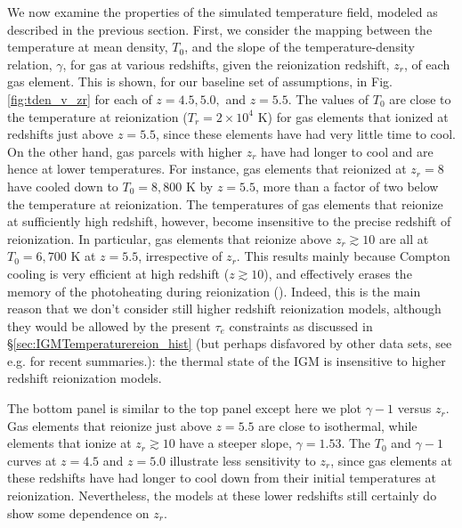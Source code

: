 We now examine the properties of the simulated temperature field, modeled as described in the previous section. 
First, we consider the mapping between the temperature at mean density, $T_0$, and the slope of the temperature-density
relation, $\gamma$, for gas at various redshifts, given the reionization redshift, $z_r$, of each gas element. This
is shown, for our baseline set of assumptions, in Fig. \ref{fig:tden_v_zr} for each of $z=4.5,5.0,$ and $z=5.5$.
The values of $T_0$ are close to the temperature at reionization ($T_r = 2 \times 10^4$ K) for gas elements that ionized at redshifts
just above $z=5.5$, since these elements have had very little time to cool. On the other hand, gas parcels with higher $z_r$ have had longer to cool
and are hence at lower temperatures. For instance, gas elements that reionized at $z_r = 8$ have cooled down to $T_0 = 8,800$ K by
$z = 5.5$, more than a factor of two below the temperature at reionization. The temperatures of gas elements that reionize at sufficiently
high redshift, however, become insensitive to the precise redshift of reionization. In particular, gas elements that
reionize above $z_r \gtrsim 10$ are all at $T_0 = 6,700$ K at $z=5.5$, irrespective of $z_r$. This results mainly
because Compton cooling is very efficient at high redshift ($z \gtrsim 10$), and effectively erases the 
memory of the photoheating during
reionization (\citealt{Hui:1997dp}). Indeed, this is the main reason that we don't consider still higher redshift reionization
models, although they would be allowed by the present $\tau_e$ constraints as discussed in \S \ref{sec:IGMTemperaturereion_hist} (but perhaps disfavored by other data sets, see e.g. \citealt{Robertson:2013bq,Kuhlen:2012vy} for recent summaries.): 
the thermal state of the IGM is insensitive to higher redshift reionization models.

The bottom panel is similar to the top panel
except here we plot $\gamma-1$ versus $z_r$. Gas elements that reionize just above $z = 5.5$ are close to isothermal, while
elements that ionize at $z_r \gtrsim 10$ have a steeper slope, $\gamma = 1.53$. The $T_0$ and $\gamma-1$ curves at $z=4.5$ and $z=5.0$ illustrate
less sensitivity to $z_r$, since gas elements at these redshifts have had longer to cool down from their initial
temperatures at reionization. Nevertheless, the models at these lower redshifts still certainly do show some 
dependence on $z_r$. 

